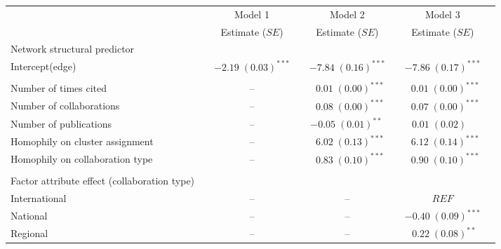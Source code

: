
\begin{table}
\begin{center}
\hspace*{-1cm}
\small
\begin{tabular}{@{}lcclclcl@{}}
\toprule
           &  & Model 1 &  & Model 2  &  & Model 3\\ \cmidrule{3-3} \cmidrule{5-5} \cmidrule{7-7}            &  & Estimate ($SE$) &  & Estimate ($SE$)  &  & Estimate ($SE$) \\ \midrule
           Network structural predictor &  &   &  &  &  \\
\hspace{10pt}Intercept(edge) & & $-2.19 \; (0.03)^{***}$ & & $-7.84 \; (0.16)^{***}$ & & $-7.86 \; (0.17)^{***}$ \\ \\
Number of times cited        & &       --  & & $\hspace{6pt}0.01 \; (0.00)^{***}$ &  & $\hspace{6pt}0.01 \; (0.00)^{***}$  \\
Number of collaborations     & &  --  & & $\hspace{6pt}0.08 \; (0.00)^{***}$ &  & $\hspace{6pt}0.07 \; (0.00)^{***}$  \\
Number of publications       & &  --  & & $-0.05 \; (0.01)^{**~}$ &  & $0.01 \; (0.02)^{~~~~}$   \\
Homophily on cluster assignment &  &   --  &  & $\hspace{6pt}6.02 \; (0.13)^{***}$ &  & $\hspace{6pt}6.12 \; (0.14)^{***}$  \\
Homophily on collaboration type   &   & -- &   & $\hspace{6pt}0.83 \; (0.10)^{***}$ &  & $\hspace{6pt}0.90 \; (0.10)^{***}$  \\ \\
Factor attribute effect (collaboration type) &  &    &  &  &   &   \\
\hspace{10pt}International   &  & --   &  & --   &  & $REF$\\
\hspace{10pt}National        & &  --   &  &  -- & & $-0.40 \; (0.09)^{***}$ \\
\hspace{10pt}Regional        & &  --   &  & --  & & $\hspace{6pt}0.22 \; (0.08)^{**~}$   \\

\end{tabular}
\end{center}
\end{table}
